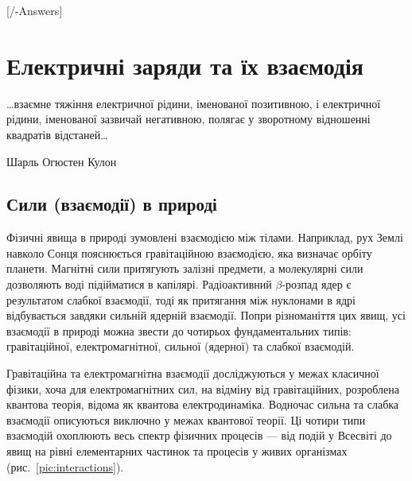 
[\currfilebase/\currfilebase-Answers]
\chapter{Електричні заряди та їх взаємодія}\label{\currfilebase}\hypertarget{Charges}{}
\graphicspath{{\currfilebase/Pictures}}
\epigraph{\Alexander\ldots взаємне тяжіння електричної рідини, іменованої позитивною, і
електричної рідини, іменованої зазвичай негативною, полягає у зворотному відношенні
квадратів відстаней\ldots }{Шарль Огюстен Кулон}


\section{Сили (взаємодії) в природі}\hypertarget{fundamental-interactions}{}

Фізичні явища в природі зумовлені взаємодією між тілами. Наприклад, рух Землі навколо
Сонця пояснюється гравітаційною взаємодією, яка визначає орбіту планети. Магнітні сили
притягують залізні предмети, а молекулярні сили дозволяють воді підійматися в капілярі.
Радіоактивний $\beta$-розпад ядер є результатом слабкої взаємодії, тоді як притягання між
нуклонами в ядрі відбувається завдяки сильній ядерній взаємодії. Попри різноманіття цих
явищ, усі взаємодії в природі можна звести до чотирьох фундаментальних типів:
гравітаційної, електромагнітної, сильної (ядерної) та слабкої взаємодій.


Гравітаційна та електромагнітна взаємодії досліджуються у межах класичної фізики, хоча
для електромагнітних сил, на відміну від гравітаційних, розроблена квантова теорія, відома
як квантова електродинаміка. Водночас сильна та слабка взаємодії описуються виключно у
межах квантової теорії. Ці чотири типи взаємодій охоплюють весь спектр фізичних процесів
--- від подій у Всесвіті до явищ на рівні елементарних частинок та процесів у живих
організмах (рис.~\ref{pic:interactions}).

